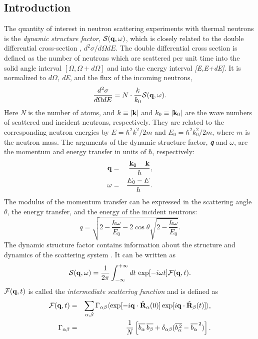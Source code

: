 \documentclass[a4paper,11pt]{article}
\begin{document}
\subsection{Introduction}
\label{scattering_introduction}
The quantity of interest in neutron scattering experiments with thermal neutrons is the {\em dynamic structure factor}, 
${\cal S}({\bf q},\omega)$, which is closely related to the double differential cross-section \cite{Lovesey}, 
$d^2\sigma/d\Omega dE$.  The double differential cross section is defined as the number of neutrons which
are scattered per unit time into the solid angle interval $[\Omega,\Omega+d\Omega]$ and into the energy interval \textit{[E,E+dE]}. 
It is normalized to $d\Omega$, \textit{dE}, and the flux of the incoming neutrons,
\begin{equation}
\label{eq:sqw_1}
\frac{d^{2}\sigma}{d\Omega dE} = N\cdot\frac{k}{k_0}{\cal S}({\bf q},\omega).
\end{equation}
Here \textit{N} is the number of atoms, and $k\equiv|{\bf k}|$  and $k_0\equiv |{\bf k}_0|$ are the wave numbers of scattered and 
incident neutrons, respectively. They are related to the corresponding neutron energies by 
$E = \hbar^2 k^2/2m$ and $E_0 = \hbar^2 k_0^2/2m$, where $m$ is the neutron mass. The arguments of the dynamic structure 
factor, \textit{\textbf{q}} and $\omega$, are the momentum and energy transfer in units of $\hbar$, respectively:
\begin{eqnarray}
{\bf q} &= &\frac{{\bf k}_0 - {\bf k}}{\hbar},\\
\omega  &= &\frac{E_0 - E}{\hbar}.
\end{eqnarray}
The modulus of the momentum transfer can be expressed in the scattering angle $\theta$, the energy transfer, and the energy of 
the incident neutrons:
\begin{equation}
q = \sqrt{2 - \frac{\hbar\omega}{E_0} 
          - 2\cos\theta\sqrt{2 - \frac{\hbar\omega}{E_0}}}.
\end{equation}
The dynamic structure factor contains information about the structure and dynamics of the scattering system \cite{VanHove}.
It can be written as 
\begin{equation}
\label{eq:sqw_2}
{\cal S}({\bf q},\omega) = \frac{1}{2\pi}\int_{-\infty}^{+\infty}dt\, \exp[-i\omega t]{\cal F}({\bf q},t).
\end{equation}
${\cal F}({\bf q},t)$ is called the {\em intermediate scattering function} and is defined as
\begin{eqnarray}
\label{eq:fqt}
{\cal F}({\bf q},t) &= &\sum_{\alpha,\beta}\Gamma_{\alpha\beta}
\langle\exp[-i{\bf q}\cdot\hat{\bf R}_\alpha(0)]
       \exp[i{\bf q}\cdot\hat{\bf R}_\beta(t)]\rangle,\\
\label{eq:gamma}
\Gamma_{\alpha\beta} &= &\frac{1}{N}
\left[\overline{\mbox{$b_\alpha$}}\,\overline{\mbox{$b_\beta$}} 
+ \delta_{\alpha\beta}
 (\overline{b_\alpha^{\,2}} - \overline{b_\alpha}^{\,2})\right].
\end{eqnarray}
\end{document}
